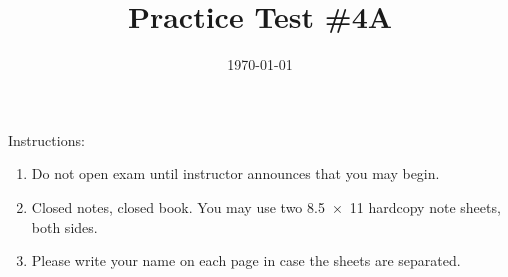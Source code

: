 \documentclass[exam,addpoints,noanswers]{exam}
\title{Practice Test \#4A}
\date{\today}
\author{\mobeardInstructorShort}
\begin{document}
\maketitle
\vfill
\mobeardExamNameBlock
\vfill
Instructions: 
\begin{enumerate}
\item Do not open exam until instructor announces that you may begin.
\item Closed notes, closed book.  You may use two \SI{8.5x11}{\inch} hardcopy note sheets, both sides.
\item Please write your name on each page in case the sheets are separated. 
\end{enumerate}
\vfill
\begin{center}
\gradetable[h][questions]
\end{center}
\clearpage
\end{document}
